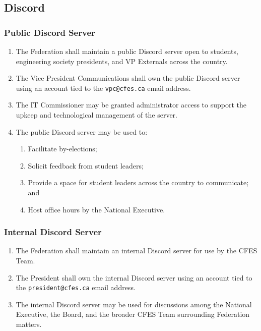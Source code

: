\subsection{Discord}
\label{discord}

\subsubsection{Public Discord Server}
\label{public-discord-server}

\begin{enumerate}
 \item
  The Federation shall maintain a public Discord server open to students, engineering society presidents, and VP Externals across the country.
 \item
  The Vice President Communications shall own the public Discord server using an account tied to the \texttt{vpc@cfes.ca} email address.
 \item
  The IT Commissioner may be granted administrator access to support the upkeep and technological management of the server.
 \item
  The public Discord server may be used to:

  \begin{enumerate}
   \item
    Facilitate by-elections;
   \item
    Solicit feedback from student leaders;
   \item
    Provide a space for student leaders across the country to communicate; and
   \item
    Host office hours by the National Executive.
  \end{enumerate}

\end{enumerate}

\subsubsection{Internal Discord Server}
\label{internal-discord-server}

\begin{enumerate}
 \item
  The Federation shall maintain an internal Discord server for use by the CFES Team.
 \item
  The President shall own the internal Discord server using an account tied to the \texttt{president@cfes.ca} email address.
 \item
  The internal Discord server may be used for discussions among the National Executive, the Board, and the broader CFES Team surrounding Federation matters.
\end{enumerate}

